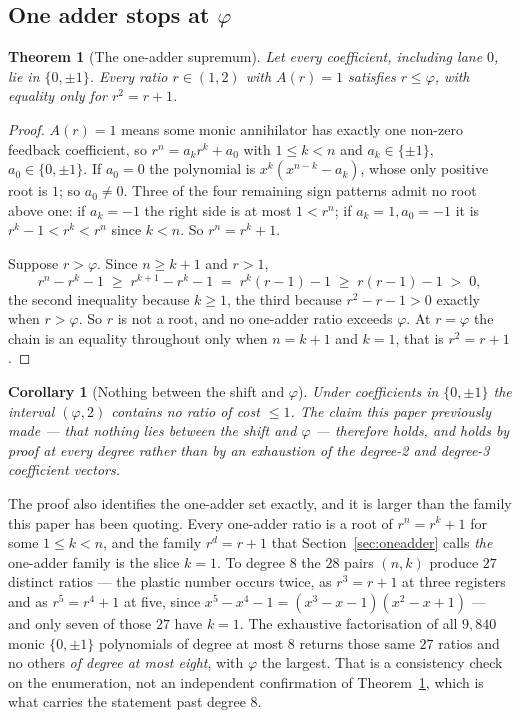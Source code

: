 \documentclass[11pt]{article}
\newtheorem{theorem}{Theorem}
\newtheorem{corollary}{Corollary}
\theoremstyle{definition}
\begin{document}
\subsection{One adder stops at \texorpdfstring{$\varphi$}{phi}}\label{sec:t6}

\begin{theorem}[The one-adder supremum]\label{thm:t6}
Let every coefficient, including lane $0$, lie in $\{0,\pm1\}$. Every ratio
$r\in(1,2)$ with $A(r)=1$ satisfies $r\le\varphi$, with equality only for
$r^{2}=r+1$.
\end{theorem}

\begin{proof}
$A(r)=1$ means some monic annihilator has exactly one non-zero feedback
coefficient, so $r^{n}=a_kr^{k}+a_0$ with $1\le k<n$ and $a_k\in\{\pm1\}$,
$a_0\in\{0,\pm1\}$. If $a_0=0$ the polynomial is $x^{k}(x^{n-k}-a_k)$, whose
only positive root is $1$; so $a_0\ne0$. Three of the four remaining sign
patterns admit no root above one: if $a_k=-1$ the right side is at most
$1<r^{n}$; if $a_k=1,a_0=-1$ it is $r^{k}-1<r^{k}<r^{n}$ since $k<n$. So
$r^{n}=r^{k}+1$.

Suppose $r>\varphi$. Since $n\ge k+1$ and $r>1$,
\[
  r^{n}-r^{k}-1 \;\ge\; r^{k+1}-r^{k}-1 \;=\; r^{k}(r-1)-1
               \;\ge\; r(r-1)-1 \;>\;0 ,
\]
the second inequality because $k\ge1$, the third because $r^2-r-1>0$ exactly
when $r>\varphi$. So $r$ is not a root, and no one-adder ratio exceeds
$\varphi$. At $r=\varphi$ the chain is an equality throughout only when
$n=k+1$ and $k=1$, that is $r^{2}=r+1$.
\end{proof}

\begin{corollary}[Nothing between the shift and $\varphi$]\label{cor:nothingbetween}
Under coefficients in $\{0,\pm1\}$ the interval $(\varphi,2)$ contains no ratio
of cost $\le1$. The claim this paper previously made --- that nothing lies
between the shift and $\varphi$ --- therefore holds, and holds by proof at every
degree rather than by an exhaustion of the degree-2 and degree-3 coefficient
vectors.
\end{corollary}

The proof also identifies the one-adder set exactly, and it is larger than the
family this paper has been quoting. Every one-adder ratio is a root of
$r^{n}=r^{k}+1$ for some $1\le k<n$, and the family $r^{d}=r+1$ that
Section~\ref{sec:oneadder} calls \emph{the} one-adder family is the slice $k=1$.
To degree $8$ the $28$ pairs $(n,k)$ produce $27$ distinct ratios --- the
plastic number occurs twice, as $r^{3}=r+1$ at three registers and as
$r^{5}=r^{4}+1$ at five, since $x^5-x^4-1=(x^3-x-1)(x^2-x+1)$ --- and only seven
of those $27$ have $k=1$. The exhaustive factorisation of all $9{,}840$ monic
$\{0,\pm1\}$ polynomials of degree at most $8$ returns those same $27$ ratios
and no others \emph{of degree at most eight}, with $\varphi$ the largest. That
is a consistency check on the enumeration, not an independent confirmation of
Theorem~\ref{thm:t6}, which is what carries the statement past degree $8$.
\end{document}
